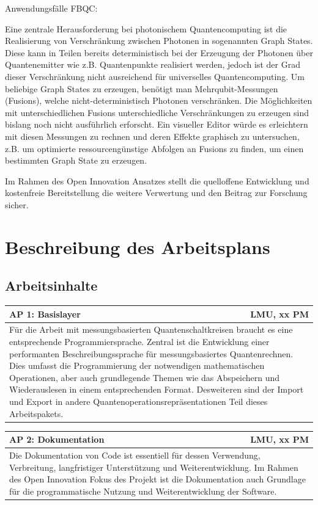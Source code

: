 \documentclass[11pt, a4paper]{article}
\newcommand{\instruction}[1]{{}}
\newcommand{\workpackage}[3]{
    \noindent
    \begin{tabularx}{\textwidth}{|X|r|}
        \hline
        \textbf{#1} & #2 \\
        \hline
        \multicolumn{2}{|p{\dimexpr\textwidth-2\tabcolsep-2\arrayrulewidth}|}{#3} \\
        \hline
    \end{tabularx}
    \vspace{1.5em}
}
\begin{document}
Anwendungsfälle FBQC: 

Eine zentrale Herausforderung bei photonischem Quantencomputing ist
die Realisierung von Verschränkung zwischen Photonen in sogenannten
Graph States. Diese kann in Teilen bereits deterministisch bei der
Erzeugung der Photonen über Quantenemitter wie z.B. Quantenpunkte
realisiert werden, jedoch ist der Grad dieser Verschränkung nicht
ausreichend für universelles Quantencomputing. Um beliebige Graph
States zu erzeugen, benötigt man Mehrqubit-Messungen (Fusions), welche
nicht-deterministisch Photonen verschränken. Die Möglichkeiten mit
unterschiedlichen Fusions unterschiedliche Verschränkungen zu erzeugen
sind bislang noch nicht ausführlich erforscht. Ein visueller Editor
würde es erleichtern mit diesen Messungen zu rechnen und deren Effekte
graphisch zu untersuchen, z.B. um optimierte ressourcengünstige
Abfolgen an Fusions zu finden, um einen bestimmten Graph State zu
erzeugen.

Im Rahmen des Open Innovation Ansatzes stellt die quelloffene
Entwicklung und kostenfreie Bereitstellung die weitere Verwertung und
den Beitrag zur Forschung sicher.

\section{Beschreibung des Arbeitsplans}


\subsection{Arbeitsinhalte}

\instruction{Unterteilung in thematische Arbeitspakete (AP). Keine rein organisatorischen Pakete.} 

\workpackage{AP 1: Basislayer}{LMU, xx PM}{Für die Arbeit mit
  messungsbasierten Quantenschaltkreisen braucht es eine entsprechende
  Programmiersprache. Zentral ist die Entwicklung einer performanten
  Beschreibungssprache für messungsbasiertes Quantenrechnen. Dies
  umfasst die Programmierung der notwendigen mathematischen
  Operationen, aber auch grundlegende Themen wie das Abspeichern und
  Wiederauslesen in einem entsprechenden Format. Desweiteren sind der
  Import und Export in andere Quantenoperationsrepräsentationen Teil
  dieses Arbeitspakets.}

\workpackage{AP 2: Dokumentation}{LMU, xx PM}{Die Dokumentation von
  Code ist essentiell für dessen Verwendung, Verbreitung,
  langfristiger Unterstützung und Weiterentwicklung. Im Rahmen des
  Open Innovation Fokus des Projekt ist die Dokumentation auch
  Grundlage für die programmatische Nutzung und Weiterentwicklung der
  Software.}
\end{document}
